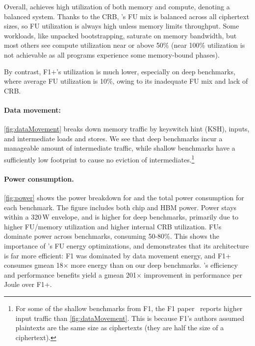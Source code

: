 Overall, \name achieves high utilization of both memory and compute, denoting a balanced system.
Thanks to the CRB, \name's FU mix is balanced across all ciphertext sizes, so FU utilization is always
high unless memory limits throughput. Some workloads, like unpacked bootstrapping,
saturate on memory bandwidth, but most others see compute utilization near or above 50\%
(near 100\% utilization is not achievable as all programs experience some memory-bound phases).

By contrast, F1+'s utilization is much lower, especially on deep benchmarks, 
where average FU utilization is 10\%,
owing to its inadequate FU mix and lack of CRB.

\figDataMovementAndPower

\paragraph{Data movement:} \autoref{fig:dataMovement}
breaks down memory traffic by keyswitch hint (KSH), inputs, and intermediate loads and stores.
We see that deep benchmarks incur a manageable amount of intermediate traffic,
while shallow benchmarks have a sufficiently low footprint to cause no eviction
of intermediates.\footnote{For some of the shallow benchmarks from F1, the F1 paper~\cite{feldmann:micro21:f1} reports higher input traffic than \autoref{fig:dataMovement}.
This is because F1's authors assumed plaintexts are the same size as ciphertexts
(they are half the size of a ciphertext).}

\paragraph{Power consumption.} \autoref{fig:power} shows the power
breakdown for \name and the total power consumption for each benchmark.
The figure includes both chip and HBM power.
Power stays within a 320\,W envelope, and is higher for deep benchmarks,
primarily due to higher FU/memory utilization and higher internal CRB utilization.
FUs dominate power across benchmarks, consuming 50-80\%.
This shows the importance of \name's FU energy optimizations,
and demonstrates that its architecture is far more efficient:
F1 was dominated by data movement energy, and F1+ consumes gmean 18$\times$
more energy than \name on our deep benchmarks.
%
\name's efficiency and performance benefits yield a gmean 201$\times$
improvement in performance per Joule over F1+.



